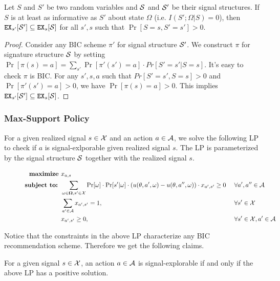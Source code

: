 \begin{lemma}
\label{lem:infomono}
Let $S$ and $S'$ be two random variables and $\S$ and $\S'$ be their signal structures. If $S$ is at least as informative as $S'$ about state $\Omega$ (i.e. $I(S' ; \Omega|S) = 0$), then $\EX_{s'}[\S'] \subseteq \EX_s[\S]$ for all $s' ,s$ such that $\Pr[S= s, S'= s'] > 0$.
\end{lemma}

\begin{proof}
Consider any BIC scheme $\pi'$ for signal structure $\S'$. We construct $\pi$ for signature structure $\S$ by setting $\Pr[\pi(s) = a] = \sum_{s'} \Pr[\pi'(s') = a] \cdot Pr[S' = s'|S = s]$. It's easy to check $\pi$ is BIC. For any $s', s ,a$ such that $Pr[S' = s',S = s] >0 $ and $\Pr[\pi'(s') = a] >0$, we have $\Pr[\pi(s) = a] > 0$. This implies $\EX_{s'}[\S'] \subseteq \EX_s[\S]$.
\end{proof}

\subsubsection{Max-Support Policy}
For a given realized signal $s \in \X$ and an action $a \in \A$, we solve the following LP to check if $a$ is signal-exlporable given realized signal $s$. The LP is parameterized by the signal structure $\S$ together with the realized signal $s$. 

\begin{figure}[H]
\begin{mdframed}
\begin{alignat*}{2}
  \textbf{maximize }   & x_{a,s}\  \\
  \textbf{subject to: } & \sum_{\omega \in \varOmega, s' \in \X} \Pr[\omega] \cdot \Pr[s' | \omega] \cdot \left(u(\theta, a', \omega) - u(\theta, a'', \omega)\right) \cdot x_{a',s'} \geq 0   &\ & \forall a',a'' \in \A \\
                       & \sum_{a'\in \A} x_{a',s'} = 1,  \ &\ & \forall s' \in \X \\
                       & x_{a',s'} \geq 0,  \ &\ & \forall s' \in \X, a'\in \A \\
\end{alignat*}
\end{mdframed}
\label{fig:public_lp}
\end{figure}

Notice that the constraints in the above LP characterize any BIC recommendation scheme. Therefore we get the following claims.
\begin{claim}
For a given signal $s \in \X$, an action $a \in \A$ is signal-explorable if and only if the above LP has a positive solution. 
\end{claim}

